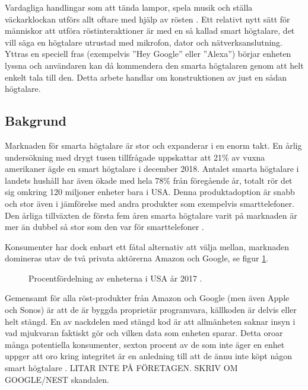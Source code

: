 Vardagliga handlingar som att tända lampor, spela musik och ställa väckar\-klockan utförs allt oftare med hjälp av rösten \cite{voicebot}. Ett relativt nytt sätt för människor att utföra röstinteraktioner är med en så kallad smart högtalare, det vill säga en högtalare utrustad med mikrofon, dator och nätverksanslutning. Yttras en speciell fras (exempelvis ”Hey Google” eller ”Alexa”) börjar enheten lyssna och användaren kan då kommendera den smarta högtalaren genom att helt enkelt tala till den. Detta arbete handlar om konstruktionen av just en sådan högtalare.

\subsection{Bakgrund}
Marknaden för smarta högtalare är stor och expanderar i en enorm takt. En årlig undersökning \cite{edison_npr2018} med drygt tusen tillfrågade uppskattar att 21\% av vuxna amerikaner ägde en smart högtalare i december 2018. Antalet smarta högtalare i landets hushåll har även ökade med hela 78\% från föregående år, totalt rör det sig omkring 120 miljoner enheter bara i USA. Denna produktadoption är snabb och stor även i jämförelse med andra produkter som exempelvis smarttelefoner. Den årliga tillväxten de första fem åren smarta högtalare varit på marknaden är mer än dubbel så stor som den var för smarttelefoner \cite{capgemini}.

Konsumenter har dock enbart ett fåtal alternativ att välja mellan, marknaden domineras utav de två privata aktörerna Amazon och Google, se figur \ref{fig:speaker_market_share}. 
\begin{figure}[h]
    \centering
    \caption{\small Procentfördelning av enheterna i USA år 2017 \cite{voicebot}.}
    \label{fig:speaker_market_share}    
\end{figure}
Gemensamt för alla röst-produkter från Amazon och Google (men även Apple och Sonos) är att de är byggda proprietär programvara, källkoden är delvis eller helt stängd. En av nackdelen med stängd kod är att allmänheten saknar insyn i vad mjukvaran faktiskt gör och vilken data som enheten sparar. Detta oroar många potentiella konsumenter, sexton procent av de som inte äger en enhet uppger att oro kring integritet är en anledning till att de ännu inte köpt någon smart högtalare \cite{voicebot}. LITAR INTE PÅ FÖRETAGEN. SKRIV OM GOOGLE/NEST skandalen.


